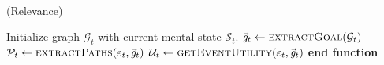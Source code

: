 \documentclass{article}
\begin{document}
\newcommand{\And}{\textit{\textbf{\footnotesize{ AND }}}}
\newcommand{\Or}{\textit{\textbf{\footnotesize{ OR }}}}
\renewcommand{\algorithmicforall}{\textbf{for each}}
\newcommand*\rfrac[2]{{}^{#1}\!/_{#2}}
\newcommand{\mathlowercal}[1]{\textit{\scriptsize{#1}}}

\\

\begin{algorithm}
	\caption{(Relevance)}
	\label{array-sum}
	\begin{algorithmic}[1]
			\Statex
			\State Initialize graph $\mathcal{G}_{t}$ with current mental state
			$\mathcal{S}_{t}$.
			\Statex
			\State $\vec{\mathit{g}}_{t} \gets \Call{extractGoal}{\mathcal{G}_{t}}$
			\Statex
			\State $\mathcal{P}_{t} \gets \Call{extractPaths}{\varepsilon_t,
			\vec{\mathit{g}}_{t}}$
			\Statex
				\State {}
			\Else
				\State $\mathcal{U}_{t} \gets \Call{getEventUtility}{\varepsilon_t,
				\vec{\mathit{g}}_{t}}$ 
				\State {}
				\Else
					\State {}
				\EndIf
			\EndIf
		\EndFunction
		\State \textbf{end function}
	\end{algorithmic}
\end{algorithm}
\end{document}
